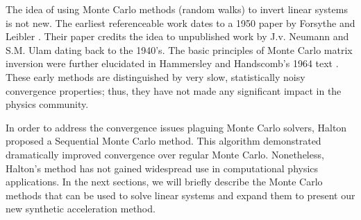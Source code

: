 \documentclass[preprint,12pt]{elsarticle}
\begin{document}
The idea of using Monte Carlo methods (random walks) to invert linear
systems is not new.  The earliest referenceable work dates to a 1950
paper by Forsythe and Leibler \cite{forsythe}.  Their paper credits
the idea to unpublished work by J.v. Neumann and S.M. Ulam dating back
to the 1940's.  The basic principles of Monte Carlo matrix inversion
were further elucidated in Hammersley and Handscomb's 1964 text
\cite{hammersley_1964}.  These early methods are distinguished by very
slow, statistically noisy convergence properties; thus, they have not
made any significant impact in the physics community.

In order to address the convergence issues plaguing Monte Carlo
solvers, Halton \cite{halton_1962,halton_1994} proposed a Sequential
Monte Carlo method.  This algorithm demonstrated dramatically improved
convergence over regular Monte Carlo.  Nonetheless, Halton's method
has not gained widespread use in computational physics
applications. In the next sections, we will briefly describe the Monte
Carlo methods that can be used to solve linear systems and expand them
to present our new synthetic acceleration method.

\end{document}
